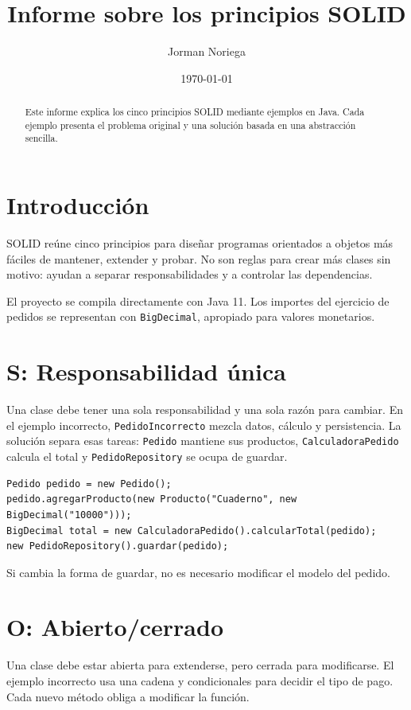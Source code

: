 \documentclass[12pt,a4paper]{article}
\title{Informe sobre los principios SOLID}
\author{Jorman Noriega}
\date{\today}
\begin{document}
\maketitle

\begin{abstract}
Este informe explica los cinco principios SOLID mediante ejemplos en Java.
Cada ejemplo presenta el problema original y una solución basada en una
abstracción sencilla.
\end{abstract}

\section{Introducción}
SOLID reúne cinco principios para diseñar programas orientados a objetos más
fáciles de mantener, extender y probar. No son reglas para crear más clases sin
motivo: ayudan a separar responsabilidades y a controlar las dependencias.

El proyecto se compila directamente con Java 11. Los importes del ejercicio de
pedidos se representan con \texttt{BigDecimal}, apropiado para valores
monetarios.

\section{S: Responsabilidad única}
Una clase debe tener una sola responsabilidad y una sola razón para cambiar.
En el ejemplo incorrecto, \texttt{PedidoIncorrecto} mezcla datos, cálculo y
persistencia. La solución separa esas tareas: \texttt{Pedido} mantiene sus
productos, \texttt{CalculadoraPedido} calcula el total y
\texttt{PedidoRepository} se ocupa de guardar.

\begin{lstlisting}
Pedido pedido = new Pedido();
pedido.agregarProducto(new Producto("Cuaderno", new BigDecimal("10000")));
BigDecimal total = new CalculadoraPedido().calcularTotal(pedido);
new PedidoRepository().guardar(pedido);
\end{lstlisting}

Si cambia la forma de guardar, no es necesario modificar el modelo del pedido.

\section{O: Abierto/cerrado}
Una clase debe estar abierta para extenderse, pero cerrada para modificarse.
El ejemplo incorrecto usa una cadena y condicionales para decidir el tipo de
pago. Cada nuevo método obliga a modificar la función.
\end{document}
